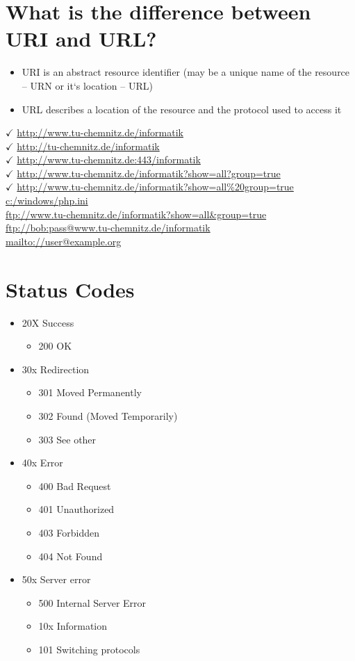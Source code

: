 \documentclass[11pt]{article}
\begin{document}
\section{What is the difference between URI and URL?}
\label{sec:org49a44a8}
\begin{itemize}
\item URI is an abstract resource identifier (may be a unique name of the resource – URN or it‘s location – URL)
\item URL describes a location of the resource and the protocol used to access it
\end{itemize}

\(\checkmark\) \url{http://www.tu-chemnitz.de/informatik}\\
\(\checkmark\) \url{http://tu-chemnitz.de/informatik}\\
\(\checkmark\) \url{http://www.tu-chemnitz.de:443/informatik}\\
\(\checkmark\) \url{http://www.tu-chemnitz.de/informatik?show=all?group=true}\\
\(\checkmark\) \url{http://www.tu-chemnitz.de/informatik?show=all\%20group=true}\\
\texttimes{} \url{c:/windows/php.ini}\\
\texttimes{} \url{ftp://www.tu-chemnitz.de/informatik?show=all\&group=true}\\
\texttimes{} \url{ftp://bob:pass@www.tu-chemnitz.de/informatik}\\
\texttimes{} \url{mailto://user@example.org}
\section{Status Codes}
\label{sec:org4f414f5}
\begin{itemize}
\item 20X Success
\begin{itemize}
\item 200 OK
\end{itemize}
\item 30x Redirection
\begin{itemize}
\item 301 Moved Permanently
\item 302 Found (Moved Temporarily)
\item 303 See other
\end{itemize}
\item 40x Error
\begin{itemize}
\item 400 Bad Request
\item 401 Unauthorized
\item 403 Forbidden
\item 404 Not Found
\end{itemize}
\item 50x Server error
\begin{itemize}
\item 500 Internal Server Error
\item 10x Information
\item 101 Switching protocols
\end{itemize}
\end{itemize}
\end{document}
